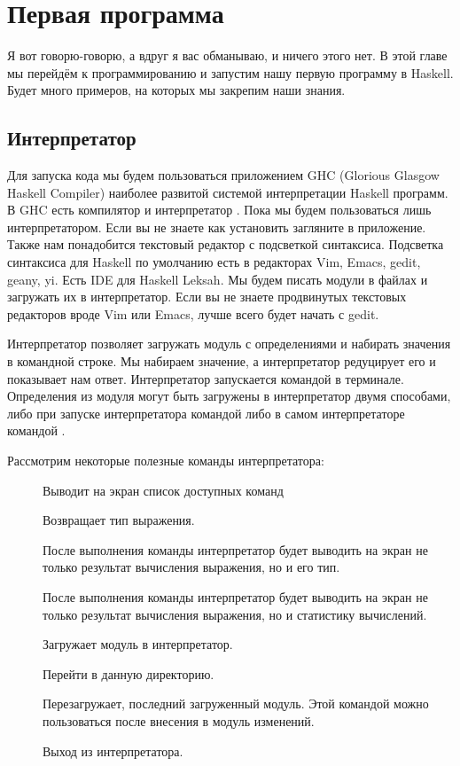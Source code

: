 \chapter{Первая программа}

Я вот говорю-говорю, а вдруг я вас обманываю, и ничего этого нет. В этой
главе мы перейдём к программированию и запустим нашу первую программу в
Haskell. Будет много примеров, на которых мы закрепим наши знания.

\section{Интерпретатор}

Для запуска кода мы будем пользоваться приложением GHC (Glorious Glasgow
Haskell Compiler) наиболее развитой системой интерпретации Haskell
программ. В GHC есть компилятор  и интерпретатор . Пока
мы будем пользоваться лишь интерпретатором. Если вы не знаете как
установить  загляните в приложение. Также нам понадобится
текстовый редактор с подсветкой синтаксиса. Подсветка синтаксиса для
Haskell по умолчанию есть в редакторах Vim, Emacs, gedit, geany, yi.
Есть IDE для Haskell Leksah. Мы будем писать модули в файлах и загружать
их в интерпретатор. Если вы не знаете продвинутых текстовых редакторов
вроде Vim или Emacs, лучше всего будет начать с gedit.

Интерпретатор позволяет загружать модуль с определениями и набирать
значения в командной строке. Мы набираем значение, а интерпретатор
редуцирует его и показывает нам ответ. Интерпретатор запускается
командой  в терминале. Определения из модуля могут быть
загружены в интерпретатор двумя способами, либо при запуске
интерпретатора командой  либо в самом
интерпретаторе командой .

Рассмотрим некоторые полезные команды интерпретатора:

\begin{description}
\item[]
Выводит на экран список доступных команд
\item[]
Возвращает тип выражения.
\item[]
После выполнения команды интерпретатор будет выводить на экран не только
результат вычисления выражения, но и его тип.
\item[]
После выполнения команды интерпретатор будет выводить на экран не только
результат вычисления выражения, но и статистику вычислений.
\item[]
Загружает модуль в интерпретатор.
\item[]
Перейти в данную директорию.
\item[]
Перезагружает, последний загруженный модуль. Этой командой можно
пользоваться после внесения в модуль изменений.
\item[]
Выход из интерпретатора.
\end{description}

